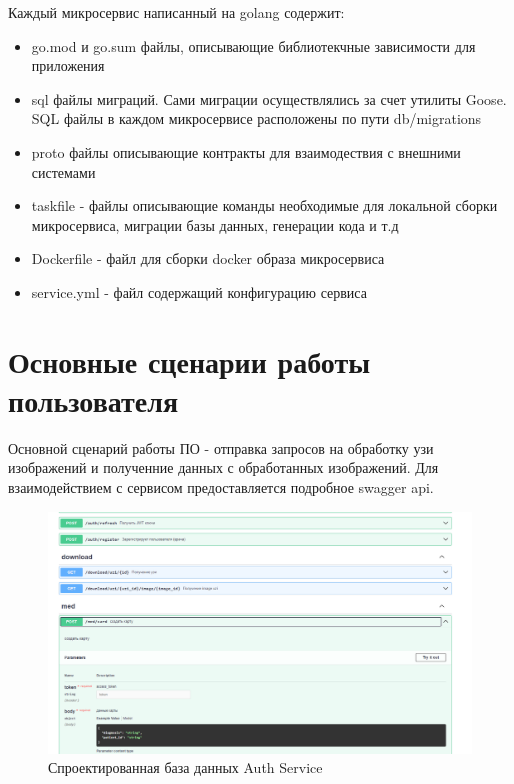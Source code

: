Каждый микросервис написанный на golang содержит:
\begin{itemize}
  \item go.mod и go.sum файлы, описывающие библиотекчные зависимости для приложения
  \item sql файлы миграций. Сами миграции осуществлялись за счет утилиты Goose. SQL файлы в каждом микросервисе расположены по пути db/migrations
  \item proto файлы описывающие контракты для взаимодествия с внешними системами
  \item taskfile - файлы описывающие команды необходимые для локальной сборки микросервиса, миграции базы данных, генерации кода и т.д
  \item Dockerfile - файл для сборки docker образа микросервиса
  \item service.yml - файл содержащий конфигурацию сервиса
\end{itemize}




\section{Основные сценарии работы пользователя}
Основной сценарий работы ПО - отправка запросов на обработку узи изображений и полученние данных с
обработанных изображений. Для взаимодействием с сервисом предоставляется подробное swagger api.
\begin{figure}[H]%
	\begin{center}
		\includegraphics[width=.9\columnwidth]{./img/swagger.png}%
	\end{center}
	\caption{Спроектированная база данных Auth Service}%
	\label{pic:auth_model}%
\end{figure}

